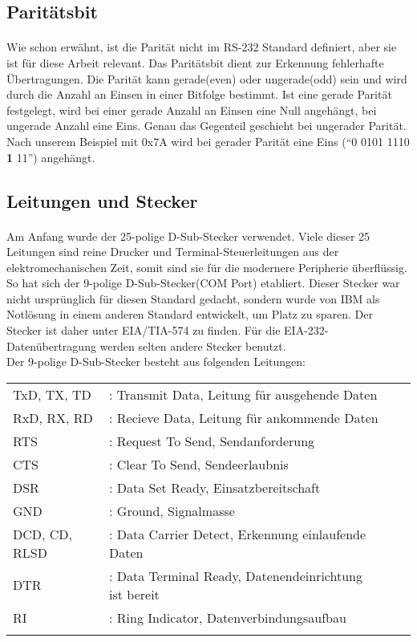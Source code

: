 \subsection{Paritätsbit}
\paragraph{}
Wie schon erwähnt, ist die Parität nicht im RS-232 Standard definiert, aber sie ist für diese Arbeit relevant. Das Paritätsbit dient zur Erkennung fehlerhafte Übertragungen. Die Parität kann gerade(even) oder ungerade(odd) sein und wird durch die Anzahl an Einsen in einer Bitfolge bestimmt. Ist eine gerade Parität festgelegt, wird bei einer gerade Anzahl an Einsen eine Null angehängt, bei ungerade Anzahl eine Eins. Genau das Gegenteil geschieht bei  ungerader Parität. Nach unserem Beispiel mit 0x7A wird bei gerader Parität eine Eins ("`0 0101 1110 \textbf{1} 11"') angehängt.

\subsection{Leitungen und Stecker}
\paragraph{}
Am Anfang wurde der 25-polige D-Sub-Stecker verwendet. Viele dieser 25 Leitungen sind reine Drucker und Terminal-Steuerleitungen aus der elektromechanischen Zeit, somit sind sie für die modernere Peripherie überflüssig. So hat sich der 9-polige D-Sub-Stecker(COM Port) etabliert. Dieser Stecker war nicht ursprünglich für diesen Standard gedacht, sondern wurde von IBM als Notlösung in einem anderen Standard entwickelt, um Platz zu sparen. Der Stecker ist daher unter EIA/TIA-574 zu finden. Für die EIA-232-Datenübertragung werden selten andere Stecker benutzt.
\\
Der 9-polige D-Sub-Stecker besteht aus folgenden Leitungen:\\
\begin{tabular}{llll}
\\
TxD, TX, TD &: Transmit Data, Leitung für ausgehende Daten \\
RxD, RX, RD &: Recieve Data, Leitung für ankommende Daten \\
RTS &: Request To Send, Sendanforderung \\
CTS &: Clear To Send, Sendeerlaubnis \\
DSR &: Data Set Ready, Einsatzbereitschaft \\
GND &: Ground, Signalmasse \\
DCD, CD, RLSD &: Data Carrier Detect, Erkennung einlaufende Daten \\
DTR &: Data Terminal Ready, Datenendeinrichtung ist bereit \\
RI &: Ring Indicator, Datenverbindungsaufbau \\\\
\end{tabular}


